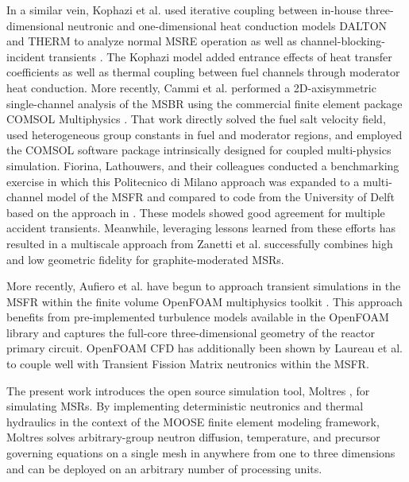 \documentclass{article}
\begin{document}
In a similar vein, Kophazi et al. used iterative coupling between in-house
three-dimensional neutronic and one-dimensional heat conduction models DALTON
and THERM to analyze normal \gls{MSRE} operation as well as
channel-blocking-incident transients \cite{kophazi_development_2009}. The
Kophazi model added entrance effects of heat transfer coefficients as well as
thermal coupling between fuel channels through moderator heat conduction. More
recently, Cammi et al. performed a 2D-axisymmetric single-channel analysis of
the \gls{MSBR} using the commercial finite element package COMSOL Multiphysics
\cite{cammi_multi-physics_2011}. That work directly solved the fuel salt
velocity field, used heterogeneous group constants in fuel and moderator
regions, and employed the \gls{COMSOL} software package intrinsically designed
for coupled multi-physics simulation.  Fiorina, Lathouwers, and their
colleagues conducted a benchmarking exercise \cite{fiorina_modelling_2014} in
which this Politecnico di Milano approach was expanded to a multi-channel model 
of the \gls{MSFR} and compared to code from the University of Delft
\cite{de_zwaan_static_2007,van_der_linden_coupled_2012} based on the approach in
\cite{kophazi_development_2009}. These models showed good agreement for
multiple accident transients. Meanwhile, leveraging lessons learned from these 
efforts has resulted in a multiscale approach from Zanetti et al. 
\cite{zanetti_geometric_2015} successfully combines high and low geometric 
fidelity for graphite-moderated \glspl{MSR}.

More recently, Aufiero et al. \cite{aufiero_development_2014} have begun to
approach transient simulations in the \gls{MSFR} within the finite volume
OpenFOAM multiphysics toolkit \cite{weller_tensorial_1998}.  This approach
benefits from pre-implemented turbulence models available in the OpenFOAM
library and captures the full-core three-dimensional geometry of the reactor
primary circuit.  OpenFOAM \gls{CFD} has additionally been shown by Laureau et
al. \cite{laureau_transient_2017} to couple well with Transient Fission Matrix
neutronics within the \gls{MSFR}.

The present work introduces the open source simulation tool, Moltres
\cite{lindsay_moltres_2017}, for simulating \glspl{MSR}.  By implementing
deterministic neutronics and thermal hydraulics in the context of the
\gls{MOOSE} finite element modeling framework, Moltres solves arbitrary-group
neutron diffusion, temperature, and precursor governing equations on a single 
mesh in anywhere from one to three dimensions and can be deployed on an 
arbitrary number of processing units.
\end{document}
